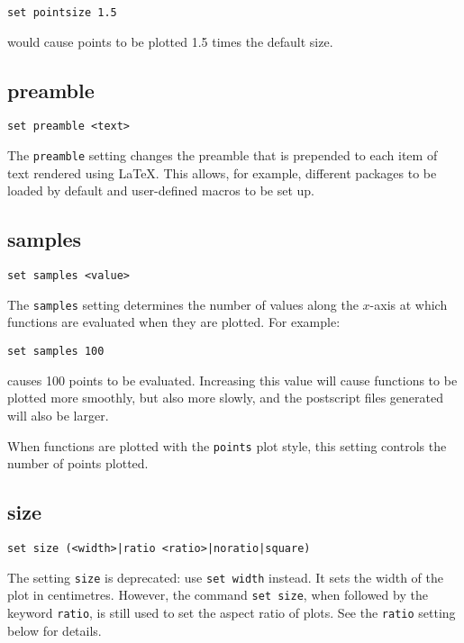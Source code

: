 \begin{verbatim}
set pointsize 1.5
\end{verbatim}

\noindent would cause points to be plotted 1.5 times the default size.

\subsection{preamble}

\begin{verbatim}
set preamble <text>
\end{verbatim}

The {\tt preamble} setting changes the preamble that is prepended to each item of
text rendered using \LaTeX{}.  This allows, for example, different packages to
be loaded by default and user-defined macros to be set up.

\subsection{samples}

\begin{verbatim}
set samples <value>
\end{verbatim}

The {\tt samples} setting determines the number of values along the $x$-axis at
which functions are evaluated when they are plotted. For example:

\begin{verbatim}
set samples 100
\end{verbatim}

\noindent causes 100 points to be evaluated.  Increasing this value will cause
functions to be plotted more smoothly, but also more slowly, and the postscript
files generated will also be larger.

When functions are plotted with the {\tt points} plot style, this setting
controls the number of points plotted.

\subsection{size}

\begin{verbatim}
set size (<width>|ratio <ratio>|noratio|square)
\end{verbatim}

The setting {\tt size} is deprecated: use {\tt set width} instead.  It sets the
width of the plot in centimetres. However, the command {\tt set size}, when
followed by the keyword {\tt ratio}, is still used to set the aspect ratio of
plots. See the {\tt ratio} setting below for details.

